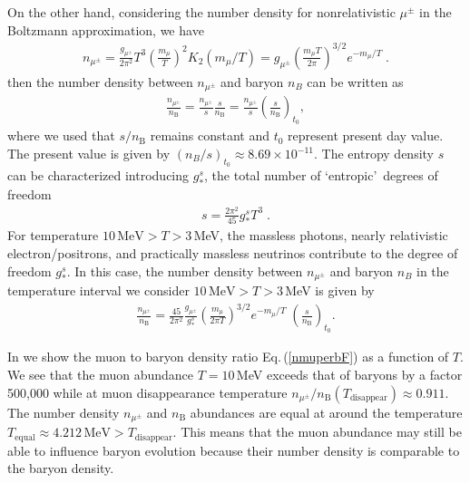 On the other hand, considering the number density for nonrelativistic $\mu^\pm$ in the Boltzmann approximation, we have
\begin{align}\label{nmupm}
n_{\mu^\pm}=\frac{g_{\mu^\pm}}{2\pi^2}T^3\left(\frac{m_\mu}{T}\right)^2 K_2(m_\mu/T)=g_{\mu^\pm}\left(\frac{m_\mu T}{2\pi}\right)^{3/2}e^{-{m_\mu}/{T}}\;. 
\end{align}
then the number density between $n_{\mu^\pm}$ and baryon $n_B$ can be written as
\begin{align}
\frac{n_{\mu^\pm}}{n_\mathrm{B}}=\frac{n_{\mu^\pm}}{s}\frac{s}{n_\mathrm{B}}=
\frac{n_{\mu^\pm}}{s}\left(\frac{s}{n_\mathrm{B}}\right)_{\!t_0},
\end{align}
where we used that $s/n_\mathrm{B}$ remains constant and $t_0$ represent present day value. The present value is given by $(n_B/s)_{t_0}\approx8.69\times10^{-11}$. The entropy density $s$ can be characterized introducing $g^s_\ast$, the total number of \lq entropic\rq\ degrees of freedom
\begin{align}\label{entrop}
s=\frac{2\pi^2}{45}g^s_\ast T^3\;.
\end{align}
For temperature $10\,\mathrm{MeV} >T>3 $\,MeV, the massless photons, nearly relativistic electron/positrons, and practically massless neutrinos contribute to the degree of freedom $g^s_\ast$.  In this case, the number density between $n_{\mu^\pm}$ and baryon $n_B$ in the temperature interval we consider $10\,\mathrm{MeV} >T>3 $\,MeV is given by
\begin{align}\label{nmuperbF} 
\frac{n_{\mu^\pm}}{n_\mathrm{B}}=\frac{45}{2\pi^2}\frac{g_{\mu^\pm}}{g^s_\ast}\left(\frac{m_\mu}{2\pi T}\right)^{3/2}e^{-{m_\mu}/{T}}\;\left(\frac{s}{n_\mathrm{B}}\right)_{\!t_0}.
\end{align}
 
In  we show the muon to baryon density ratio Eq.\,(\ref{nmuperbF}) as a function of $T$. We see that the muon abundance $T=10$\,MeV exceeds that of baryons by a factor 500,000 while at muon disappearance temperature $n_{\mu^\pm}/n_\mathrm{B}(T_\mathrm{disappear})\approx0.911$. The number density $n_{\mu^\pm}$ and $n_\mathrm{B}$  abundances are equal at around the temperature $T_\mathrm{equal}\approx4.212\,\mathrm{MeV} >  T_\mathrm{disappear}$.  This means that the muon abundance may still be able to influence baryon evolution because their number density is comparable to the baryon density.%

